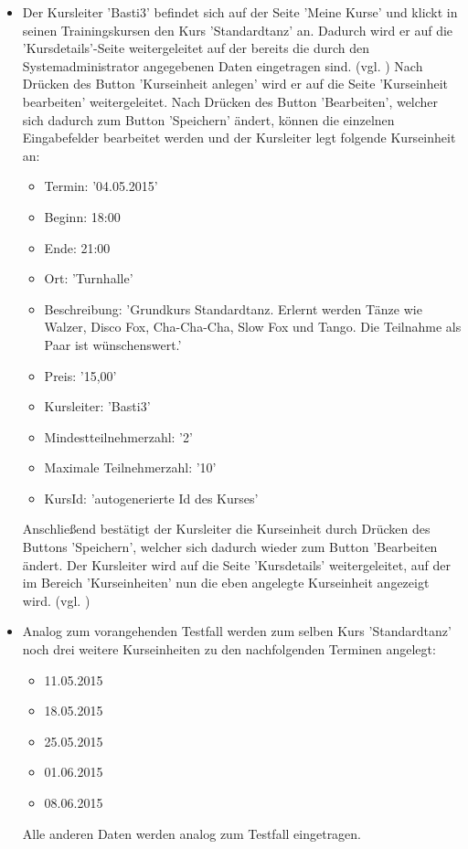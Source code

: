 \documentclass[a4paper]{scrreprt}
\begin{document}
\begin{itemize}
			\item {} 
			Der Kursleiter 'Basti3' befindet sich auf der Seite 'Meine Kurse' und klickt in seinen Trainingskursen den Kurs 'Standardtanz' an. Dadurch wird er auf die 'Kursdetails'-Seite weitergeleitet auf der bereits die durch den Systemadministrator angegebenen Daten eingetragen sind. (vgl. ) Nach Drücken des Button 'Kurseinheit anlegen' wird er auf die Seite 'Kurseinheit bearbeiten' weitergeleitet. Nach Drücken des Button 'Bearbeiten', welcher sich dadurch zum Button 'Speichern' ändert, können die einzelnen Eingabefelder bearbeitet werden und der Kursleiter legt folgende Kurseinheit an:
			\begin{itemize}
				\item Termin: '04.05.2015'
				\item Beginn: 18:00
				\item Ende: 21:00
				\item Ort: 'Turnhalle'
				\item Beschreibung: 'Grundkurs Standardtanz. Erlernt werden Tänze wie Walzer, Disco Fox, Cha-Cha-Cha, Slow Fox und Tango. Die Teilnahme als Paar ist wünschenswert.'
				\item Preis: '15,00'
				\item Kursleiter: 'Basti3'
				\item Mindestteilnehmerzahl: '2'
				\item Maximale Teilnehmerzahl: '10'
				\item KursId: 'autogenerierte Id des Kurses'
			\end{itemize}	
			Anschließend bestätigt der Kursleiter die Kurseinheit durch Drücken des Buttons 'Speichern', welcher sich dadurch wieder zum Button 'Bearbeiten ändert. Der Kursleiter wird auf die Seite 'Kursdetails' weitergeleitet, auf der im Bereich 'Kurseinheiten' nun die eben angelegte Kurseinheit angezeigt wird. (vgl. )
			
			\item {} 
			Analog zum vorangehenden Testfall  werden zum selben Kurs 'Standardtanz' noch drei weitere Kurseinheiten zu den nachfolgenden Terminen angelegt:
			\begin{itemize}
				\item 11.05.2015
				\item 18.05.2015
				\item 25.05.2015
				\item 01.06.2015
				\item 08.06.2015
			\end{itemize}		
			Alle anderen Daten werden analog zum Testfall  eingetragen.
			

\end{itemize}
\end{document}
